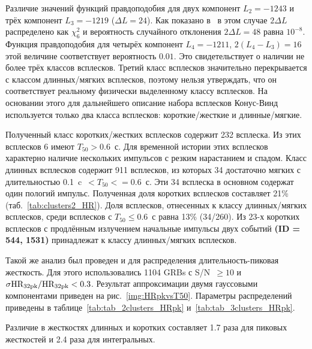 Различие значений функций правдоподобия для двух компонент $L_2 = -1243$ и трёх компонент $L_3 = -1219$ ($\Delta L = 24$). Как показано в~\citep{Horvath_2006} в этом случае $2\Delta L$ распределено как $\chi^2_6$ и вероятность случайного отклонения $2\Delta L = 48$ равна $10^{-8}$. Функция правдоподобия для четырёх компонент $L_4 = -1211$, $2(L_4 - L_3) = 16$ этой величине соответствует вероятность $0.01$. Это свидетельствует о наличии не более трёх классов всплесков. Третий класс всплесков значительно перекрывается с классом длинных/мягких всплесков, поэтому нельзя утверждать, что он соответствует реальному физически выделенному классу всплесков. На основании этого для дальнейшего описание набора всплесков Конус-Винд используется только два класса всплесков: короткие/жесткие и длинные/мягкие.

Полученный класс коротких/жестких всплесков содержит 232 всплеска. Из этих всплесков 6 имеют $T_{50} > 0.6$~с. Для временной истории этих всплесков характерно наличие нескольких импульсов с резким нарастанием и спадом.  Класс длинных всплесков содержит 911 всплесков, из которых 34 достаточно мягких с длительностью 0.1~c~$< T_{50} <=0.6$~с. Эти 34 всплеска в основном содержат один пологий импульс. Полученная доля коротких всплесков составляет 21\% (таб.~\ref{tab:clusters2_HR}). Доля всплесков, отнесенных к классу длинных/мягких всплесков, среди всплесков с $T_{50} \leq 0.6$~с  равна 13\% (34/260). Из 23-х коротких всплесков с продлённым излучением начальные импульсы двух событий \textbf{(ID = 544, 1531)} принадлежат к классу длинных/мягких всплесков.

Такой же анализ был проведен и для распределения длительность-пиковая жесткость. Для этого использовались 1104 GRBs с S/N~$ \geq 10$ и $\sigma \mbox{HR}_{32\mbox{\scriptsize pk}}/\mbox{HR}_{32\mbox{\scriptsize pk}} <0.3$. Результат аппроксимации двумя гауссовыми компонентами приведен на рис.~\ref{img:HRpkvsT50}. Параметры распределений приведены в таблице~\ref{tab:tab_2clusters_HRpk} и~\ref{tab:tab_3clusters_HRpk}. 

Различие в жесткостях длинных и коротких составляет 1.7 раза для пиковых жесткостей и 2.4 раза для интегральных. 



